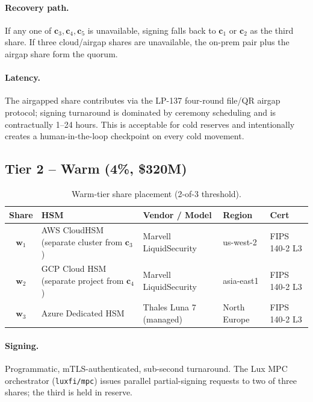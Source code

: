 \paragraph{Recovery path.} If any one of $\mathbf{c}_3, \mathbf{c}_4,
\mathbf{c}_5$ is unavailable, signing falls back to $\mathbf{c}_1$
or $\mathbf{c}_2$ as the third share. If three cloud/airgap shares
are unavailable, the on-prem pair plus the airgap share form the
quorum.

\paragraph{Latency.} The airgapped share contributes via the LP-137
\cite{lp137} four-round file/QR airgap protocol; signing turnaround
is dominated by ceremony scheduling and is contractually 1--24 hours.
This is acceptable for cold reserves and intentionally creates a
human-in-the-loop checkpoint on every cold movement.

\subsection{Tier 2 -- Warm (4\%, \$320M)}

\begin{table}[h]
\centering
\small
\begin{tabular}{cllll}
\toprule
\textbf{Share} & \textbf{HSM} & \textbf{Vendor / Model} &
\textbf{Region} & \textbf{Cert} \\
\midrule
$\mathbf{w}_1$ & AWS CloudHSM (separate cluster from $\mathbf{c}_3$) &
  Marvell LiquidSecurity & us-west-2 & FIPS 140-2 L3 \\
$\mathbf{w}_2$ & GCP Cloud HSM (separate project from $\mathbf{c}_4$) &
  Marvell LiquidSecurity & asia-east1 & FIPS 140-2 L3 \\
$\mathbf{w}_3$ & Azure Dedicated HSM &
  Thales Luna 7 (managed) & North Europe & FIPS 140-2 L3 \\
\bottomrule
\end{tabular}
\caption{Warm-tier share placement (2-of-3 threshold).}
\label{tab:warm}
\end{table}

\paragraph{Signing.} Programmatic, mTLS-authenticated, sub-second
turnaround. The Lux MPC orchestrator (\texttt{luxfi/mpc}) issues
parallel partial-signing requests to two of three shares; the third
is held in reserve.

